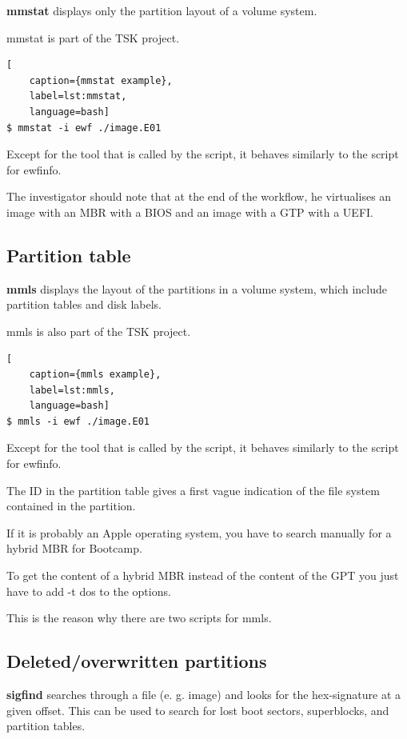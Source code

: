 \textbf{mmstat} displays only the partition layout of a volume system.

mmstat is part of the TSK project.

\begin{lstlisting}[
    caption={mmstat example},
    label=lst:mmstat,
    language=bash]
$ mmstat -i ewf ./image.E01
\end{lstlisting}

\noindent Except for the tool that is called by the script, it behaves similarly to the script for ewfinfo.

The investigator should note that at the end of the workflow, he virtualises an image with an MBR with a BIOS and an image with a GTP with a UEFI.

\subsection{Partition table}

\textbf{mmls} displays the layout of the partitions in a volume system, which include partition tables and disk labels.

mmls is also part of the TSK project.

\begin{lstlisting}[
    caption={mmls example},
    label=lst:mmls,
    language=bash]
$ mmls -i ewf ./image.E01
\end{lstlisting}

\noindent Except for the tool that is called by the script, it behaves similarly to the script for ewfinfo.

The ID in the partition table gives a first vague indication of the file system contained in the partition.

If it is probably an Apple operating system, you have to search manually for a hybrid MBR for Bootcamp.

To get the content of a hybrid MBR instead of the content of the GPT you just have to add \glqq{}-t dos\grqq{} to the options.

This is the reason why there are two scripts for mmls.

\subsection{Deleted/overwritten partitions}

\textbf{sigfind} searches through a file (e. g. image) and looks for the hex-signature at a given offset. This can be used to search for lost boot sectors, superblocks, and partition tables.

